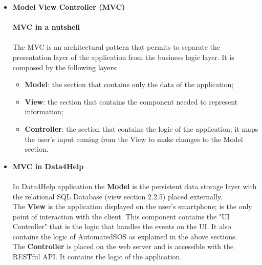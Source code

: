 \documentclass[DD.tex]{subfiles}
\begin{document}
\begin{itemize}
	\item \textbf{Model View Controller (MVC)}\\\\
		\textbf{MVC in a nutshell}\\\\
		The MVC is an architectural pattern that permits to separate the presentation layer of the application from the business logic layer. It is composed by the following layers: \\
		\vspace{-5mm}
		\begin{itemize}
		\setlength\itemsep{-0.9em}
			\item\textbf{Model}: the section that contains only the data of the application;\\
			\item\textbf{View}: the section that contains the component needed to represent information;\\
			\item\textbf{Controller}: the section that contains the logic of the application; it maps the user's input coming from the View to make changes to the Model section.\\
		\end{itemize}
		\newpage
	\item \textbf{MVC in Data4Help}\\\\
		In Data4Help application the \textbf{Model} is the persistent data storage layer with the relational SQL Database (view section 2.2.5) placed externally.\\
		The \textbf{View} is the application displayed on the user's smartphone; is the only point of interaction with the client.
		This component contains the "UI Controller" that is the logic that handles the events on the UI. It also contains the logic of AutomatedSOS as explained in the above sections.\\
		The \textbf{Controller} is placed on the web server and is accessible with the RESTful API. It contains the logic of the application.\\
\end{itemize}
\end{document}
